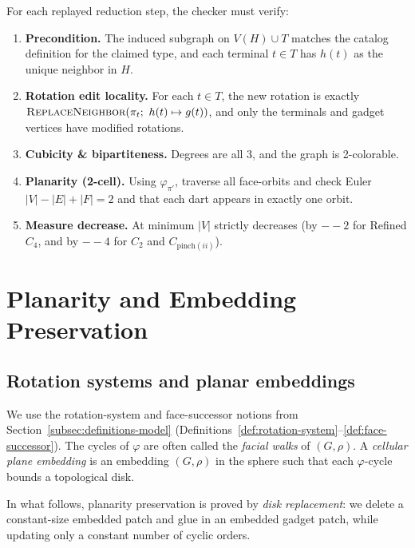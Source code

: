 \documentclass[12pt]{article}
\theoremstyle{definition}
\newcommand{\CtwoDelta}{-4}
\newcommand{\RefinedCfourDelta}{-2}
\begin{document}
For each replayed reduction step, the checker must verify:
\begin{enumerate}
  \item \textbf{Precondition.} The induced subgraph on $V(H)\cup T$ matches the
        catalog definition for the claimed type, and each terminal $t\in T$ has
        $h(t)$ as the unique neighbor in $H$.
  \item \textbf{Rotation edit locality.} For each $t\in T$, the new rotation is
        exactly $\textsc{ReplaceNeighbor}(\pi_t;\ h(t)\mapsto g(t))$, and only
        the terminals and gadget vertices have modified rotations.
  \item \textbf{Cubicity \& bipartiteness.} Degrees are all 3, and the graph is
        2-colorable.
  \item \textbf{Planarity (2-cell).} Using $\varphi_{\pi'}$, traverse all
        face-orbits and check Euler $|V|-|E|+|F|=2$ and that each dart appears in
        exactly one orbit.
  \item \textbf{Measure decrease.} At minimum $|V|$ strictly decreases
        (by $-\RefinedCfourDelta$ for Refined $C_4$, and by $-\CtwoDelta$ for $C_2$ and $C_{\text{pinch}(ii)}$).
\end{enumerate}

\section{Planarity and Embedding Preservation}
\label{sec:planarity}

\subsection{Rotation systems and planar embeddings}
\label{subsec:rotations}


We use the rotation-system and face-successor notions from Section~\ref{subsec:definitions-model} (Definitions~\ref{def:rotation-system}--\ref{def:face-successor}).
The cycles of $\varphi$ are often called the \emph{facial walks} of $(G,\rho)$.
A \emph{cellular plane embedding} is an embedding $(G,\rho)$ in the sphere such that each $\varphi$-cycle bounds a topological disk.

In what follows, planarity preservation is proved by \emph{disk replacement}:
we delete a constant-size embedded patch and glue in an embedded gadget patch, while updating only
a constant number of cyclic orders.
\end{document}
